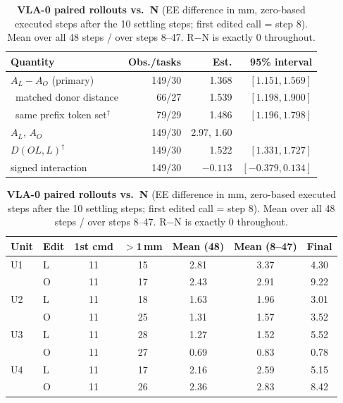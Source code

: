 \begin{table}[t]
\centering\small
\begin{minipage}[t]{0.47\textwidth}\centering
\caption{\textbf{VLA-0 within-call responses} (normalized bins, $\times10^{-2}$; task-cluster 95\% bootstrap intervals; $^\dagger$post hoc).}
\label{tab:vla0}
\footnotesize\setlength{\tabcolsep}{2.5pt}
\begin{tabular}{@{}lrrr@{}}\toprule
Quantity & Obs./tasks & Est. & 95\% interval\\\midrule
$A_L-A_O$ (primary) & 149/30 & 1.368 & $[1.151,1.569]$\\
\ matched donor distance & 66/27 & 1.539 & $[1.198,1.900]$\\
\ same prefix token set$^\dagger$ & 79/29 & 1.486 & $[1.196,1.798]$\\
$A_L$, $A_O$ & 149/30 & 2.97, 1.60 & \\
$D(OL,L)^\dagger$ & 149/30 & 1.522 & $[1.331,1.727]$\\
signed interaction & 149/30 & $-0.113$ & $[-0.379,0.134]$\\\bottomrule
\end{tabular}
\end{minipage}\hfill
\begin{minipage}[t]{0.5\textwidth}\centering
\caption{\textbf{VLA-0 paired rollouts vs.\ N} (EE difference in mm, zero-based executed steps after the 10 settling steps; first edited call = step 8). Mean over all 48 steps / over steps 8--47. R$-$N is exactly 0 throughout.}
\label{tab:vla0cl}
\footnotesize\setlength{\tabcolsep}{2.6pt}
\begin{tabular}{@{}llccccc@{}}\toprule
Unit & Edit & 1st cmd & $>$1\,mm & Mean (48) & Mean (8--47) & Final\\\midrule
U1 & L & 11 & 15 & 2.81 & 3.37 & 4.30\\
 & O & 11 & 17 & 2.43 & 2.91 & 9.22\\
U2 & L & 11 & 18 & 1.63 & 1.96 & 3.01\\
 & O & 11 & 25 & 1.31 & 1.57 & 3.52\\
U3 & L & 11 & 28 & 1.27 & 1.52 & 5.52\\
 & O & 11 & 27 & 0.69 & 0.83 & 0.78\\
U4 & L & 11 & 17 & 2.16 & 2.59 & 5.15\\
 & O & 11 & 26 & 2.36 & 2.83 & 8.42\\\bottomrule
\end{tabular}
\end{minipage}
\end{table}

